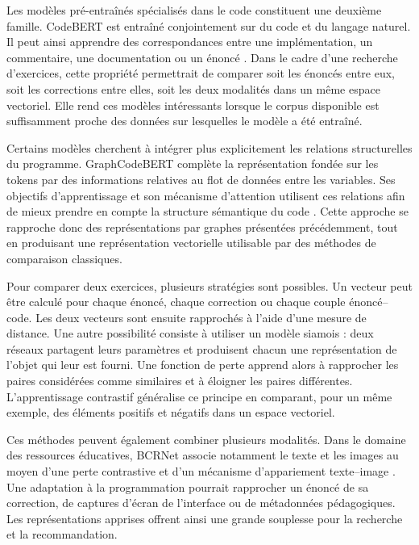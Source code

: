 Les modèles pré-entraînés spécialisés dans le code constituent une deuxième
famille. CodeBERT est entraîné conjointement sur du code et du langage naturel.
Il peut ainsi apprendre des correspondances entre une implémentation, un
commentaire, une documentation ou un énoncé \cite{feng_2020}. Dans le cadre
d'une recherche d'exercices, cette propriété permettrait de comparer soit les
énoncés entre eux, soit les corrections entre elles, soit les deux modalités
dans un même espace vectoriel. Elle rend ces modèles intéressants lorsque le
corpus disponible est suffisamment proche des données sur lesquelles le modèle
a été entraîné.

Certains modèles cherchent à intégrer plus explicitement les relations
structurelles du programme. GraphCodeBERT complète la représentation fondée
sur les tokens par des informations relatives au flot de données entre les
variables. Ses objectifs d'apprentissage et son mécanisme d'attention utilisent
ces relations afin de mieux prendre en compte la structure sémantique du code
\cite{guo_2021}. Cette approche se rapproche donc des représentations par
graphes présentées précédemment, tout en produisant une représentation
vectorielle utilisable par des méthodes de comparaison classiques.

Pour comparer deux exercices, plusieurs stratégies sont possibles. Un vecteur
peut être calculé pour chaque énoncé, chaque correction ou chaque couple
énoncé--code. Les deux vecteurs sont ensuite rapprochés à l'aide d'une mesure
de distance. Une autre possibilité consiste à utiliser un modèle siamois :
deux réseaux partagent leurs paramètres et produisent chacun une représentation
de l'objet qui leur est fourni. Une fonction de perte apprend alors à rapprocher
les paires considérées comme similaires et à éloigner les paires différentes.
L'apprentissage contrastif généralise ce principe en comparant, pour un même
exemple, des éléments positifs et négatifs dans un espace vectoriel.

Ces méthodes peuvent également combiner plusieurs modalités. Dans le domaine
des ressources éducatives, BCRNet associe notamment le texte et les images au
moyen d'une perte contrastive et d'un mécanisme d'appariement texte--image
\cite{mu_2023}. Une adaptation à la programmation pourrait rapprocher un
énoncé de sa correction, de captures d'écran de l'interface ou de métadonnées
pédagogiques. Les représentations apprises offrent ainsi une grande souplesse
pour la recherche et la recommandation.

